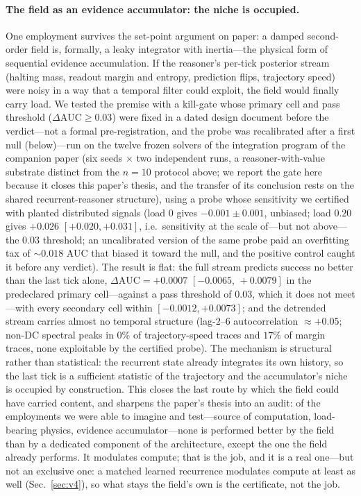 \documentclass{article}
\newcommand{\compcite}{\citep{anon2026cognition}}
\newcommand{\compcite}{\citep{arrabal2026cognition}}
\begin{document}
\paragraph{The field as an evidence accumulator: the niche is occupied.} One
employment survives the set-point argument on paper: a damped second-order
field is, formally, a leaky integrator with inertia---the physical form of
sequential evidence accumulation. If the reasoner's per-tick posterior stream
(halting mass, readout margin and entropy, prediction flips, trajectory
speed) were noisy in a way that a temporal filter could exploit, the field
would finally carry load. We tested the premise with a kill-gate whose primary
cell and pass threshold ($\Delta\mathrm{AUC}\ge0.03$) were fixed in a dated
design document before the verdict---not a formal pre-registration, and the
probe was recalibrated after a first null (below)---run
on the twelve frozen solvers of the integration program of the
companion paper \compcite{} (six seeds $\times$ two independent runs, a reasoner-with-value
substrate distinct from the $n{=}10$ protocol above; we report the gate
here because it closes this paper's thesis, and the transfer of its
conclusion rests on the shared recurrent-reasoner structure), using a
probe whose
sensitivity we certified with planted distributed signals (load $0$ gives
$-0.001\pm0.001$, unbiased; load $0.20$ gives $+0.026$ $[+0.020,+0.031]$, i.e.\
sensitivity at the scale of---but not above---the $0.03$ threshold; an
uncalibrated version of the
same probe paid an overfitting tax of ${\sim}0.018$ AUC that biased it
toward the null, and the positive control caught it before any verdict). The
result is flat: the full stream predicts success no better than the last
tick alone, $\Delta\mathrm{AUC}=+0.0007$ $[-0.0065,\,+0.0079]$ in the
predeclared primary cell---against a pass threshold of $0.03$, which it does
not meet---with every secondary cell within
$[-0.0012,+0.0073]$; and the detrended stream carries almost no temporal
structure (lag-$2$--$6$ autocorrelation $\approx+0.05$; non-DC spectral
peaks in $0\%$ of trajectory-speed traces and $17\%$ of margin traces,
none exploitable by the certified probe). The mechanism is
structural rather than statistical: the recurrent state already integrates
its own history, so the last tick is a sufficient statistic of the
trajectory and the accumulator's niche is occupied by construction. This
closes the last route by which the field could have carried content, and
sharpens the paper's thesis into an audit: of the employments we were able to
imagine and test---source of computation, load-bearing physics, evidence
accumulator---none is performed better by the field than by a dedicated
component of the architecture, except the one the field already performs. It
modulates compute; that is the job, and it is a real one---but not an
exclusive one: a matched learned recurrence modulates compute at least as well
(Sec.~\ref{sec:v4}), so what stays the field's own is the certificate, not the
job.
\end{document}
